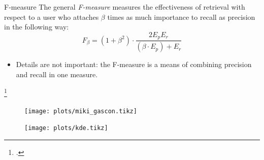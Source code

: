 \documentclass[12pt]{beamer}
\theoremstyle{break}
\begin{document}
\begin{frame}

	\begin{block}{F-measure}
	    The general \emph{F-measure} measures the effectiveness of retrieval with respect to a user who attaches $\beta$ times as much importance to recall as precision in the following way:\footnotemark
	    \begin{equation*}
	        F_{\beta} = (1 + \beta^{2}) \cdot \frac{2 E_{p} E_{r}}{(\beta \cdot E_{p}) + E_{r}}
	    \end{equation*}
	\end{block}
	
	\begin{itemize}
		\item Details are not important: the F-measure is a means of combining precision and recall in one measure.	
	\end{itemize}

	\footcitetext{Rijsbergen1979}
	
\end{frame}




\begin{frame}

	\begin{table}
		\footnotesize
	    \centering
	    
	\end{table}


\end{frame}




\begin{frame}[plain]

	\begin{figure}
	    \centering
	    \texttt{[image: plots/miki\_gascon.tikz]}
	\end{figure}
	

\end{frame}




\begin{frame}[plain]
	\begin{figure}
	    \centering
	    \texttt{[image: plots/kde.tikz]}
	\end{figure}

\end{frame}
\end{document}
